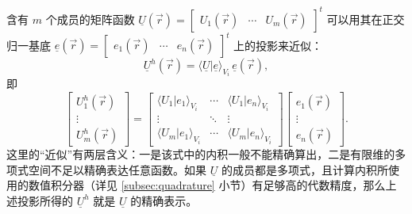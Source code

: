 含有 $m$ 个成员的矩阵函数 $\underline{U}(\vec{r})=\begin{bmatrix}U_{1}(\vec{r}) & \cdots & U_{m}(\vec{r})\end{bmatrix}^{t}$
可以用其在正交归一基底 $\underline{e}(\vec{r})=\begin{bmatrix}e_{1}(\vec{r}) & \cdots & e_{n}(\vec{r})\end{bmatrix}^{t}$
上的投影来近似：
\begin{equation}
\underline{U}^{h}(\vec{r})=\langle\underline{U}\vert\underline{e}\rangle_{V_{i}}\,\underline{e}(\vec{r}),
\end{equation}
即
\begin{equation}
\begin{bmatrix}U_{1}^{h}(\vec{r})\\
\vdots\\
U_{m}^{h}(\vec{r})
\end{bmatrix}=\begin{bmatrix}\langle U_{1}\vert e_{1}\rangle_{V_{i}} & \cdots & \langle U_{1}\vert e_{n}\rangle_{V_{i}}\\
\vdots & \ddots & \vdots\\
\langle U_{m}\vert e_{1}\rangle_{V_{i}} & \cdots & \langle U_{m}\vert e_{n}\rangle_{V_{i}}
\end{bmatrix}\begin{bmatrix}e_{1}(\vec{r})\\
\vdots\\
e_{n}(\vec{r})
\end{bmatrix}.\label{eq:function_projection}
\end{equation}
这里的“近似”有两层含义：一是该式中的内积一般不能精确算出，二是有限维的多项式空间不足以精确表达任意函数。如果 $\underline{U}$
的成员都是多项式，且计算内积所使用的数值积分器（详见 \ref{subsec:quadrature} 小节）有足够高的代数精度，那么上述投影所得的
$\underline{U}^{h}$ 就是 $\underline{U}$ 的精确表示。

